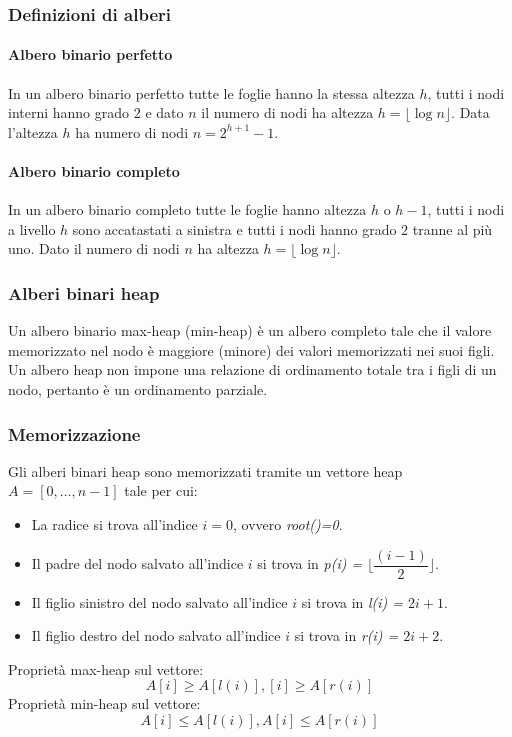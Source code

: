 \subsubsection{Definizioni di alberi}
\paragraph{Albero binario perfetto}
In un albero binario perfetto tutte le foglie hanno la stessa altezza $h$, tutti i nodi interni hanno grado $2$ e dato $n$ il numero di nodi ha altezza
$h=\lfloor \log n\rfloor$. Data l'altezza $h$ ha numero di nodi $n=2^{h+1}-1$.
\paragraph{Albero binario completo}
In un albero binario completo tutte le foglie hanno altezza $h$ o $h-1$, tutti i nodi a livello $h$ sono accatastati a sinistra e tutti i nodi hanno grado 
$2$ tranne al pi\`u uno. Dato il numero di nodi $n$ ha altezza $h=\lfloor \log n\rfloor$.
\subsubsection{Alberi binari heap}
Un albero binario max-heap (min-heap) \`e un albero completo tale che il valore memorizzato nel nodo \`e maggiore (minore) dei valori memorizzati nei suoi
figli. Un albero heap non impone una relazione di ordinamento totale tra i figli di un nodo, pertanto \`e un ordinamento parziale. 
\subsubsection{Memorizzazione}
Gli alberi binari heap sono memorizzati tramite un vettore heap $A=[0, \dots, n-1]$ tale per cui: 
\begin{itemize}
\item La radice si trova all'indice $i=0$, ovvero \emph{root()=0}.
\item Il padre del nodo salvato all'indice $i$ si trova in \emph{p(i) = $\lfloor\dfrac{(i-1)}{2} \rfloor$}.
\item Il figlio sinistro del nodo salvato all'indice $i$ si trova in \emph{l(i) = $2i+1$}.
\item Il figlio destro del nodo salvato all'indice $i$ si trova in \emph{r(i) = $2i+2$}.
\end{itemize}
Propriet\`a max-heap sul vettore: 
$$A[i]\ge A[l(i)], [i]\ge A[r(i)]$$ 
Propriet\`a min-heap sul vettore: 
$$A[i]\le A[l(i)], A[i]\le A[r(i)]$$
